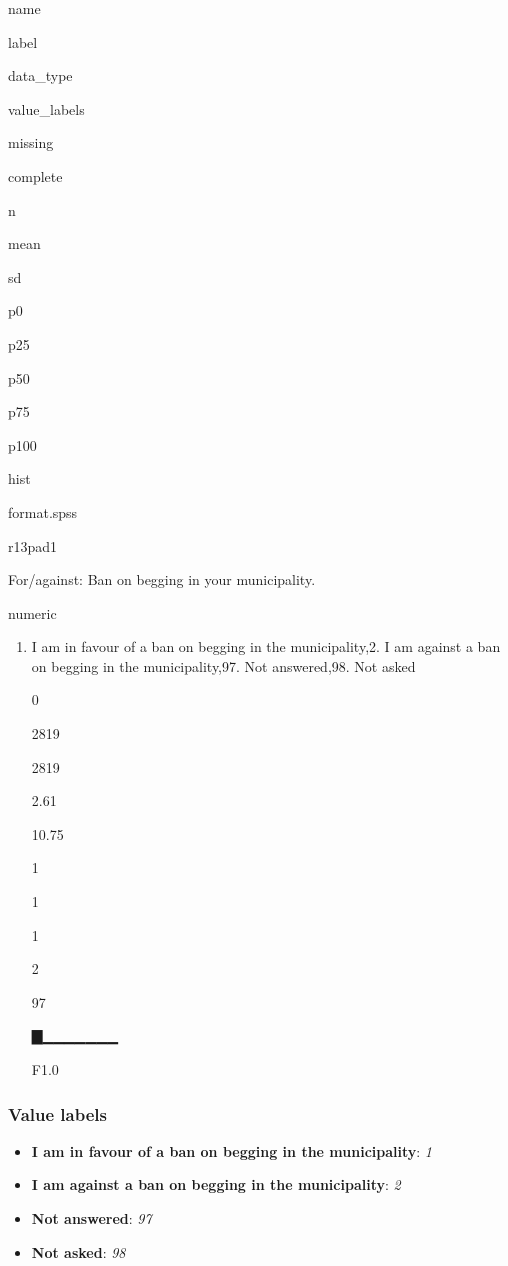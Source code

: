 \documentclass[]{book}
\providecommand{\tightlist}{%
  \setlength{\itemsep}{0pt}\setlength{\parskip}{0pt}}
\begin{document}
name

label

data\_type

value\_labels

missing

complete

n

mean

sd

p0

p25

p50

p75

p100

hist

format.spss

r13pad1

For/against: Ban on begging in your municipality.

numeric

\begin{enumerate}
\def\labelenumi{\arabic{enumi}.}
\tightlist
\item
  I am in favour of a ban on begging in the municipality,2. I am against
  a ban on begging in the municipality,97. Not answered,98. Not asked

  0

  2819

  2819

  2.61

  10.75

  1

  1

  1

  2

  97

  ▇▁▁▁▁▁▁▁

  F1.0
\end{enumerate}

\subsubsection{Value labels}\label{r13pad1_labels}

\begin{itemize}
\tightlist
\item
  \textbf{I am in favour of a ban on begging in the municipality}:
  \emph{1}
\item
  \textbf{I am against a ban on begging in the municipality}: \emph{2}
\item
  \textbf{Not answered}: \emph{97}
\item
  \textbf{Not asked}: \emph{98}
\end{itemize}
\end{document}
